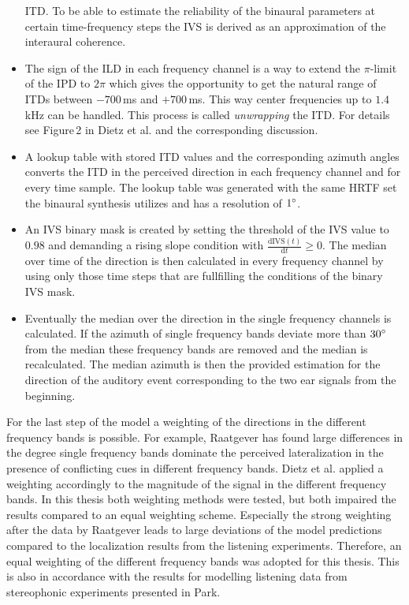 \begin{itemize}
        \ac{ITD}. To be able to estimate the reliability of the binaural
        parameters at certain time-frequency steps the \ac{IVS} is derived as an
        approximation of the interaural
        coherence.
    \item The sign of the \ac{ILD} in each frequency channel is a way to extend
        the $\pi$-limit of the \ac{IPD} to $2\pi$ which gives the opportunity to
        get the natural range of \acp{ITD} between $-700$\,ms and $+700$\,ms.
        This way center frequencies up to $1.4$\,kHz can be handled. This process is called
        \emph{unwrapping} the \ac{ITD}. For details see Figure\,2
        in Dietz et al.\autocite{Dietz2011} and the corresponding discussion.
    \item A lookup table with stored \ac{ITD} values and the
        corresponding azimuth angles converts the \ac{ITD} in the perceived
        direction in each frequency channel and for every time sample.
        The lookup table was generated with the same \ac{HRTF} set the
        binaural synthesis utilizes and has a resolution of $1^\circ$.
    \item An \ac{IVS} binary mask is created by setting the threshold of the
        \ac{IVS} value to $0.98$ and
        demanding a rising slope condition with
        $\frac{\text{dIVS}(t)}{\text{d}t} \ge 0$. The median over time
        of the direction is then calculated in every frequency channel by using
        only those time steps that are fullfilling the conditions of the binary
        \ac{IVS} mask.
    \item Eventually the median over the direction in the single frequency
        channels is
        calculated. If the azimuth of single frequency bands deviate more
        than $30^\circ$ from the median these frequency bands are removed and
        the median is recalculated. The median azimuth is then the
        provided estimation for the direction of the auditory event corresponding
        to the two ear signals from the beginning.
\end{itemize}

For the last step of the model a weighting of the directions in the different
frequency bands is possible. For example,
Raatgever\autocite[][Sec.\,3.4]{Raatgever1980} has found large differences
in the degree single frequency bands dominate the perceived lateralization in
the presence of conflicting cues in different frequency bands. Dietz et
al.\autocite{Dietz2011} applied a weighting accordingly to the magnitude of the
signal in the different frequency bands. In this thesis both weighting
methods were tested, but both impaired the results compared to an equal
weighting scheme. Especially the strong weighting after the data by Raatgever
leads to large deviations of the model predictions compared to the
localization results from the listening experiments.
Therefore, an equal weighting of the different frequency bands was adopted for
this thesis. This is also in accordance with the results for modelling listening
data from stereophonic experiments presented in
Park.\autocite[][Fig.\,5.10]{Park2007}

